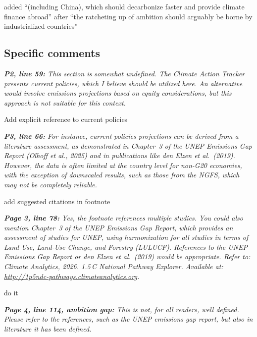 \documentclass[11pt]{article}
\newenvironment{italic}{\itshape}{\par}
\begin{document}
added ``(including China), which should decarbonize faster and provide climate finance abroad'' after ``the ratcheting up of ambition should arguably be borne by industrialized countries''



\subsection*{Specific comments}

\begin{italic}
\textbf{P2, line 59:} This section is somewhat undefined. The Climate Action Tracker presents current policies, which I believe should be utilized here. An alternative would involve emissions projections based on equity considerations, but this approach is not suitable for this context.
\end{italic}

Add explicit reference to current policies




\begin{italic}
\textbf{P3, line 66:} For instance, current policies projections can be derived from a literature assessment, as demonstrated in Chapter~3 of the UNEP Emissions Gap Report (Olhoff et al., 2025) and in publications like den Elzen et al.\ (2019). However, the data is often limited at the country level for non-G20 economies, with the exception of downscaled results, such as those from the NGFS, which may not be completely reliable.
\end{italic}


add suggested citations in footnote



\begin{italic}
\textbf{Page 3, line 78:} Yes, the footnote references multiple studies. You could also mention Chapter~3 of the UNEP Emissions Gap Report, which provides an assessment of studies for UNEP, using harmonization for all studies in terms of Land Use, Land-Use Change, and Forestry (LULUCF). References to the UNEP Emissions Gap Report or den Elzen et al.\ (2019) would be appropriate. Refer to: Climate Analytics, 2026. \emph{1.5\,\textdegree C National Pathway Explorer}. Available at: \url{http://1p5ndc-pathways.climateanalytics.org}.
\end{italic}


do it



\begin{italic}
\textbf{Page 4, line 114, ambition gap:} This is not, for all readers, well defined. Please refer to the references, such as the UNEP emissions gap report, but also in literature it has been defined.
\end{italic}
\end{document}
